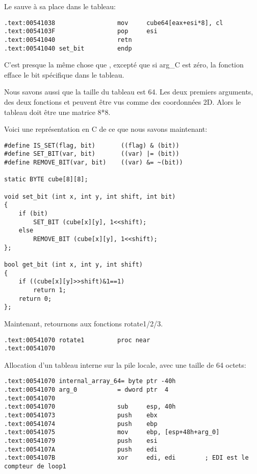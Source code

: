 Le sauve à sa place dans le tableau:

\begin{lstlisting}[style=customasmx86]
.text:00541038                 mov     cube64[eax+esi*8], cl
.text:0054103F                 pop     esi
.text:00541040                 retn
.text:00541040 set_bit         endp
\end{lstlisting}

C'est presque la même chose que , excepté que si arg\_C est zéro, la
fonction efface le bit spécifique dans le tableau.

Nous savons aussi que la taille du tableau est 64. Les deux premiers arguments, des
deux fonctions  et  peuvent être vus comme des coordonnées
2D. Alors le tableau doit être une matrice 8*8.

Voici une représentation en C de ce que nous savons maintenant:

\begin{lstlisting}[style=customc]
#define IS_SET(flag, bit)       ((flag) & (bit))
#define SET_BIT(var, bit)       ((var) |= (bit))
#define REMOVE_BIT(var, bit)    ((var) &= ~(bit))

static BYTE cube[8][8];

void set_bit (int x, int y, int shift, int bit)
{
	if (bit)
		SET_BIT (cube[x][y], 1<<shift);
	else
		REMOVE_BIT (cube[x][y], 1<<shift);
};

bool get_bit (int x, int y, int shift)
{
	if ((cube[x][y]>>shift)&1==1)
		return 1;
	return 0;
};
\end{lstlisting}

Maintenant, retournons aux fonctions rotate1/2/3.

\begin{lstlisting}[style=customasmx86]
.text:00541070 rotate1         proc near
.text:00541070
\end{lstlisting}

Allocation d'un tableau interne sur la pile locale, avec une taille de 64 octets:

\begin{lstlisting}[style=customasmx86]
.text:00541070 internal_array_64= byte ptr -40h
.text:00541070 arg_0           = dword ptr  4
.text:00541070
.text:00541070                 sub     esp, 40h
.text:00541073                 push    ebx
.text:00541074                 push    ebp
.text:00541075                 mov     ebp, [esp+48h+arg_0]
.text:00541079                 push    esi
.text:0054107A                 push    edi
.text:0054107B                 xor     edi, edi        ; EDI est le compteur de loop1
\end{lstlisting}

